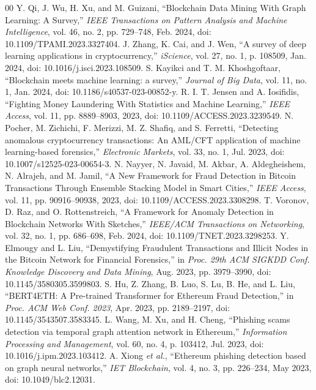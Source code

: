 \documentclass{ieeeaccess}
\begin{document}
\begin{thebibliography}{00}
 Y. Qi, J. Wu, H. Xu, and M. Guizani, ``Blockchain Data Mining With Graph Learning: A Survey,'' \emph{IEEE Transactions on Pattern Analysis and Machine Intelligence}, vol. 46, no. 2, pp. 729--748, Feb. 2024, doi: 10.1109/TPAMI.2023.3327404.
 J. Zhang, K. Cai, and J. Wen, ``A survey of deep learning applications in cryptocurrency,'' \emph{iScience}, vol. 27, no. 1, p. 108509, Jan. 2024, doi: 10.1016/j.isci.2023.108509.
 S. Kayikci and T. M. Khoshgoftaar, ``Blockchain meets machine learning: a survey,'' \emph{Journal of Big Data}, vol. 11, no. 1, Jan. 2024, doi: 10.1186/s40537-023-00852-y.
 R. I. T. Jensen and A. Iosifidis, ``Fighting Money Laundering With Statistics and Machine Learning,'' \emph{IEEE Access}, vol. 11, pp. 8889--8903, 2023, doi: 10.1109/ACCESS.2023.3239549.
 N. Pocher, M. Zichichi, F. Merizzi, M. Z. Shafiq, and S. Ferretti, ``Detecting anomalous cryptocurrency transactions: An AML/CFT application of machine learning-based forensics,'' \emph{Electronic Markets}, vol. 33, no. 1, Jul. 2023, doi: 10.1007/s12525-023-00654-3.
 N. Nayyer, N. Javaid, M. Akbar, A. Aldegheishem, N. Alrajeh, and M. Jamil, ``A New Framework for Fraud Detection in Bitcoin Transactions Through Ensemble Stacking Model in Smart Cities,'' \emph{IEEE Access}, vol. 11, pp. 90916--90938, 2023, doi: 10.1109/ACCESS.2023.3308298.
 T. Voronov, D. Raz, and O. Rottenstreich, ``A Framework for Anomaly Detection in Blockchain Networks With Sketches,'' \emph{IEEE/ACM Transactions on Networking}, vol. 32, no. 1, pp. 686--698, Feb. 2024, doi: 10.1109/TNET.2023.3298253.
 Y. Elmougy and L. Liu, ``Demystifying Fraudulent Transactions and Illicit Nodes in the Bitcoin Network for Financial Forensics,'' in \emph{Proc. 29th ACM SIGKDD Conf. Knowledge Discovery and Data Mining}, Aug. 2023, pp. 3979--3990, doi: 10.1145/3580305.3599803.
 S. Hu, Z. Zhang, B. Luo, S. Lu, B. He, and L. Liu, ``BERT4ETH: A Pre-trained Transformer for Ethereum Fraud Detection,'' in \emph{Proc. ACM Web Conf. 2023}, Apr. 2023, pp. 2189--2197, doi: 10.1145/3543507.3583345.
 L. Wang, M. Xu, and H. Cheng, ``Phishing scams detection via temporal graph attention network in Ethereum,'' \emph{Information Processing and Management}, vol. 60, no. 4, p. 103412, Jul. 2023, doi: 10.1016/j.ipm.2023.103412.
 A. Xiong \emph{et al.}, ``Ethereum phishing detection based on graph neural networks,'' \emph{IET Blockchain}, vol. 4, no. 3, pp. 226--234, May 2023, doi: 10.1049/blc2.12031.

\end{thebibliography}
\end{document}
